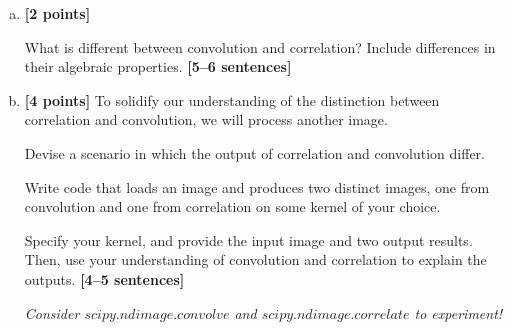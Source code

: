 \documentclass[11pt]{article}
\begin{document}
\begin{enumerate}[(a)]

    \item \textbf{[2 points]} 
    \begin{tcolorbox}[colback=orange!5!white,colframe=orange!75!black]
    What is different between convolution and correlation? Include differences in their algebraic properties. \textbf{[5--6 sentences]}
    \end{tcolorbox}
    

    
    \item \textbf{[4 points]}
    To solidify our understanding of the distinction between correlation and convolution, we will process another image.
    
    \begin{tcolorbox}[colback=orange!5!white,colframe=orange!75!black]
    Devise a scenario in which the output of correlation and convolution differ.
    
    Write code that loads an image and produces two distinct images, one from convolution and one from correlation on some kernel of your choice. 
    
    Specify your kernel, and provide the input image and two output results. Then, use your understanding of convolution and correlation to explain the outputs. \textbf{[4--5 sentences]}
    \end{tcolorbox}
    
    \emph{Consider \href{https://docs.scipy.org/doc/scipy/reference/generated/scipy.ndimage.convolve.html}{$scipy.ndimage.convolve$} and \href{https://docs.scipy.org/doc/scipy/reference/generated/scipy.ndimage.correlate.html}{$scipy.ndimage.correlate$} to experiment!}
    


\end{enumerate}
\end{document}
